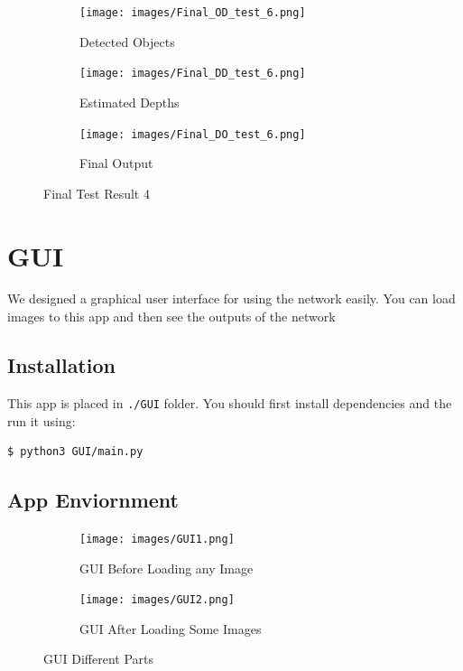 \documentclass[a4paper, openany]{book}
\newcommand{\code}{\texttt}
\begin{document}
\newpage


\begin{figure}[ht]
  \centering
    \begin{subfigure}[b]{0.45\linewidth}
    \texttt{[image: images/Final\_OD\_test\_6.png]}
    \caption{Detected Objects}
  \end{subfigure}
  \begin{subfigure}[b]{0.45\linewidth}
    \texttt{[image: images/Final\_DD\_test\_6.png]}
    \caption{Estimated Depths}
  \end{subfigure}
      \begin{subfigure}[b]{0.9\linewidth}
    \texttt{[image: images/Final\_DO\_test\_6.png]}
    \caption{Final Output}
  \end{subfigure}
  
      \caption{Final Test Result 4}
  \label{fig:DO_t_images4}
\end{figure}

\newpage

\section{GUI}
	\vspace{0.3cm}
	
We designed a graphical user interface for using the network easily. You can load images to this app and then see the outputs of the network

\subsection{Installation}
	\vspace{0.3cm}
This app is placed in \code{./GUI} folder. You should first install dependencies and the run it using:
\begin{lstlisting}[language=bash]
  $ python3 GUI/main.py
  \end{lstlisting}
  
  \subsection{App Enviornment}
	\vspace{0.3cm}
  
  
  \begin{figure}[ht]
  \centering
    \begin{subfigure}[b]{0.6\linewidth}
    \texttt{[image: images/GUI1.png]}
    \caption{GUI Before Loading any Image}
  \end{subfigure}
  \begin{subfigure}[b]{0.6\linewidth}
    \texttt{[image: images/GUI2.png]}
    \caption{GUI After Loading Some Images}
  \end{subfigure}
  
      \caption{GUI Different Parts}
  \label{fig:GUI1}
\end{figure}
  
\end{document}
